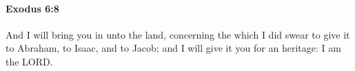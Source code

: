 
		\paragraph{Exodus 6:8} %
			\label{EXODUS-6-8}

			And I will bring you in unto the land, concerning the which I did swear to give it to Abraham, to Isaac, and to Jacob; and I will give it you for an heritage: I am the LORD.


